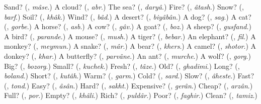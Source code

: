 \begin{tcolorbox}[breakable,colback=teal!4,colframe=teal!35!black,title={Before you move on}]
Sand? (\textbf{}, \emph{mâse}.) A cloud? (\textbf{}, \emph{abr}.) The sea? (\textbf{}, \emph{daryâ}.) Fire? (\textbf{}, \emph{âtash}.) Snow? (\textbf{}, \emph{barf}.) Soil? (\textbf{}, \emph{khâk}.) Wind? (\textbf{}, \emph{bâd}.) A desert? (\textbf{}, \emph{biyâbân}.) A dog? (\textbf{}, \emph{sag}.) A cat? (\textbf{}, \emph{gorbe}.) A horse? (\textbf{}, \emph{asb}.) A cow? (\textbf{}, \emph{gâv}.) A goat? (\textbf{}, \emph{boz}.) A sheep? (\textbf{}, \emph{gusfand}.) A bird? (\textbf{}, \emph{parande}.) A mouse? (\textbf{}, \emph{mush}.) A tiger? (\textbf{}, \emph{bebar}.) An elephant? (\textbf{}, \emph{fil}.) A monkey? (\textbf{}, \emph{meymun}.) A snake? (\textbf{}, \emph{mâr}.) A bear? (\textbf{}, \emph{khers}.) A camel? (\textbf{}, \emph{shotor}.) A donkey? (\textbf{}, \emph{khar}.) A butterfly? (\textbf{}, \emph{parvâne}.) An ant? (\textbf{}, \emph{murche}.) A wolf? (\textbf{}, \emph{gorg}.) Big? (\textbf{}, \emph{bozorg}.) Small? (\textbf{}, \emph{kuchek}.) Fresh? (\textbf{}, \emph{tâze}.) Old? (\textbf{}, \emph{ghadimi}.) Long? (\textbf{}, \emph{boland}.) Short? (\textbf{}, \emph{kutâh}.) Warm? (\textbf{}, \emph{garm}.) Cold? (\textbf{}, \emph{sard}.) Slow? (\textbf{}, \emph{âheste}.) Fast? (\textbf{}, \emph{tond}.) Easy? (\textbf{}, \emph{âsân}.) Hard? (\textbf{}, \emph{sakht}.) Expensive? (\textbf{}, \emph{gerân}.) Cheap? (\textbf{}, \emph{arzân}.) Full? (\textbf{}, \emph{por}.) Empty? (\textbf{}, \emph{khâli}.) Rich? (\textbf{}, \emph{puldâr}.) Poor? (\textbf{}, \emph{faghir}.) Clean? (\textbf{}, \emph{tamiz}.)
\end{tcolorbox}
